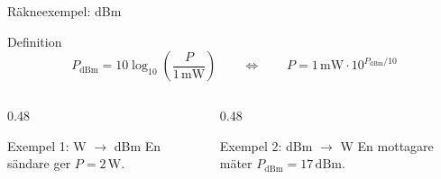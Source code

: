 \documentclass[aspectratio=169]{beamer}
\begin{document}
\begin{frame}{Räkneexempel: dBm}

\begin{block}{Definition}
\[
P_{\mathrm{dBm}} = 10\log_{10}\!\left(\frac{P}{1\,\mathrm{mW}}\right)
\qquad\Longleftrightarrow\qquad
P = 1\,\mathrm{mW}\cdot 10^{P_{\mathrm{dBm}}/10}
\]
\end{block}

\begin{columns}[T]
  \begin{column}{0.48\textwidth}
    \begin{exampleblock}{Exempel 1: W $\rightarrow$ dBm}
      En sändare ger $P = 2\,\mathrm{W}$.
    \end{exampleblock}
  \end{column}

  \begin{column}{0.48\textwidth}
    \begin{exampleblock}{Exempel 2: dBm $\rightarrow$ W}
      En mottagare mäter $P_{\mathrm{dBm}} = 17\,\mathrm{dBm}$.
    \end{exampleblock}
  \end{column}
\end{columns}

\vspace{0.1cm}
\centering
{}
\end{frame}
\end{document}
